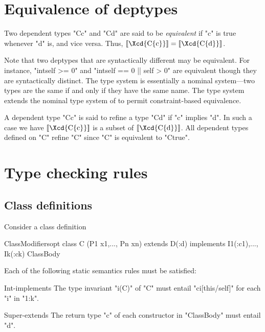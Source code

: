 \section{Equivalence of deptypes}\label{DepType:Equivalence}\label{deptype,equivalence}

Two dependent types \xcd"C{c}" and \xcd"C{d}" are said to be {\em equivalent} if 
\xcd"c" is true whenever \xcd"d" is, and vice versa. Thus, 
$\LL{\mbox{\Xcd{C\{c\}}}} = \LL{\mbox{\Xcd{C\{d\}}}}$.

Note that two deptypes that are syntactically different may be
equivalent. For instance, \xcd"int{self >= 0}" and
\xcd"int{self == 0 || self > 0}" are equivalent though they are syntactically
distinct. The \Java{} type system is essentially a nominal system---two
types are the same if and only if they have the same name. The \Xten{}
type system extends the nominal type system of \Java{} to permit
constraint-based equivalence.

A dependent type \xcd"C{c}" is said to refine a type \xcd"C{d}" if
\xcd"c" implies \xcd"d".  In such a case we have
$\LL{\mbox{\Xcd{C\{c\}}}}$ is a
subset of $\LL{\mbox{\Xcd{C\{d\}}}}$. All dependent types defined on \xcd"C" refine
\xcd"C" since \xcd"C" is equivalent to \xcd"C{true}".

\section{Type checking rules}
\subsection{Class definitions}

Consider a class definition
\begin{xten}
ClassModifiersopt 
 class C (P1 x1,..., Pn xn)  extends D(:d) 
   implements I1(:c1),..., Ik(:ck)
 ClassBody  
\end{xten}

Each of the following static semantics rules must be satisfied:

\begin{staticrule}{Int-implements}
The type invariant \xcd"i(C)" of \xcd"C" must entail
\xcd"ci[this/self]" for each \xcd"i" in \xcd"1:k".  
\end{staticrule}

\begin{staticrule}{Super-extends}
The return type \xcd"c" of each constructor in \xcd"ClassBody"
must entail \xcd"d".
\end{staticrule}

